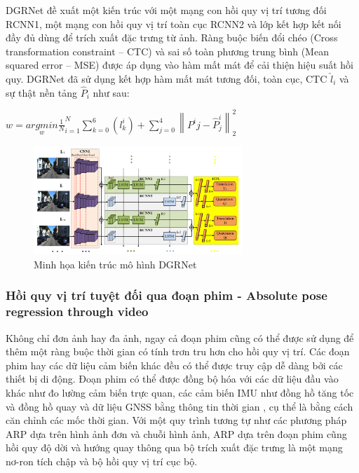 DGRNet \cite{lin2019deep} đề xuất một kiến trúc với một mạng con hồi quy vị trí tương đối RCNN1, một mạng con hồi quy vị trí toàn cục RCNN2 và lớp kết hợp kết nối đầy đủ dùng để trích xuất đặc trưng từ ảnh. Ràng buộc biến đổi chéo (Cross transformation constraint – CTC) và sai số toàn phương trung bình (Mean squared error – MSE) được áp dụng vào hàm mất mát để cải thiện hiệu suất hồi quy. DGRNet đã sử dụng kết hợp hàm mất mát tương đối, toàn cục, CTC $\hat{l}_i$ và sự thật nền tảng $\hat{P}_i$ như sau:
\begin{center}
$ w = \underset{w}{argmin} \frac{1}{N}^{N}_{i=1} \sum_{k=0}^{6}(l^i_k) + \sum_{j=0}^{4}\left \| P^ij - \hat{P}^i_j \right \|^2_2 $
\end{center}
\begin{figure}[H]
    \centering
    \includegraphics[width=0.7\textwidth]{pics/Chapter2/dgrnet.png}
    \caption{Minh họa kiến trúc mô hình DGRNet \cite{lin2019deep}}
\end{figure}
\subsubsection*{Hồi quy vị trí tuyệt đối qua đoạn phim - Absolute pose regression through video}

Không chỉ đơn ảnh hay đa ảnh, ngay cả đoạn phim cũng có thể được sử dụng để thêm một ràng buộc thời gian có tính trơn tru hơn cho hồi quy vị trí. Các đoạn phim hay các dữ liệu cảm biến khác đều có thể được truy cập dễ dàng bởi các thiết bị di động. Đoạn phim có thể được đồng bộ hóa với các dữ liệu đầu vào khác như đo lường cảm biến trực quan, các cảm biến IMU như đồng hồ tăng tốc và đồng hồ quay và dữ liệu GNSS bằng thông tin thời gian , cụ thể là bằng cách căn chỉnh các mốc thời gian. Với một quy trình tương tự như các phương pháp ARP dựa trên hình ảnh đơn và chuỗi hình ảnh, ARP dựa trên đoạn phim cũng hồi quy độ dời và hướng quay thông qua bộ trích xuất đặc trưng là một mạng nơ-ron tích chập và bộ hồi quy vị trí cục bộ.

